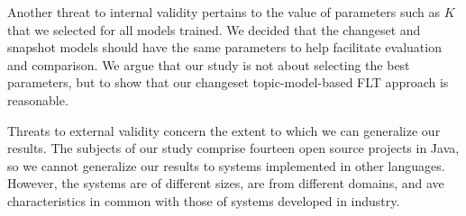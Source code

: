 Another threat to internal validity pertains to the value of parameters such as $K$ that we selected for all models trained.
We decided that the changeset and snapshot models should have the same parameters to help facilitate evaluation and comparison.
We argue that our study is not about selecting the best parameters,
but to show that our changeset topic-model-based FLT approach is reasonable.

Threats to external validity concern the extent to which we can generalize our results.
The subjects of our study comprise fourteen open source projects in Java,
so we cannot generalize our results to systems implemented in other languages.
However, the systems are of different sizes, are from different domains, and
ave characteristics in common with those of systems developed in industry.

